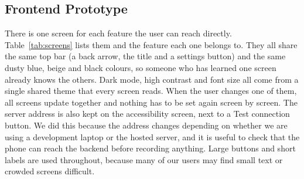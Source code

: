 \documentclass{FastFyp}
\begin{document}
\subsection{Frontend Prototype}
There is one screen for each feature the user can reach directly. Table~\ref{tab:screens} lists them and the feature each one belongs to. They all share the same top bar (a back arrow, the title and a settings button) and the same dusty blue, beige and black colours, so someone who has learned one screen already knows the others. Dark mode, high contrast and font size all come from a single shared theme that every screen reads. When the user changes one of them, all screens update together and nothing has to be set again screen by screen. The server address is also kept on the accessibility screen, next to a Test connection button. We did this because the address changes depending on whether we are using a development laptop or the hosted server, and it is useful to check that the phone can reach the backend before recording anything. Large buttons and short labels are used throughout, because many of our users may find small text or crowded screens difficult.
\end{document}
